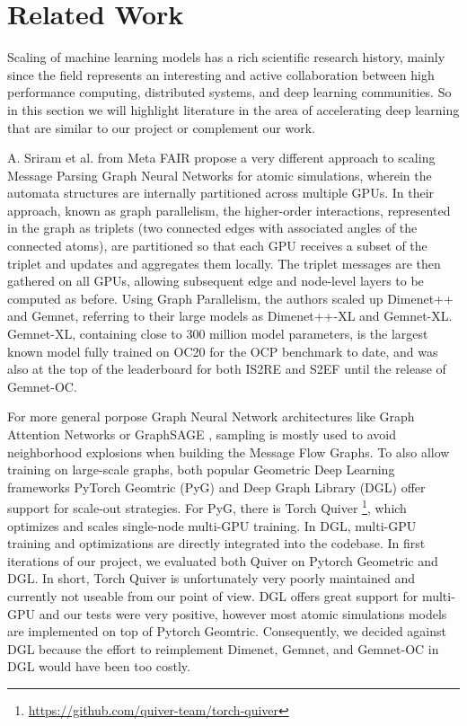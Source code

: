 \section{Related Work}
\label{section:related_work}

Scaling of machine learning models has a rich scientific research history, mainly since the field 
represents an interesting and active collaboration between high performance computing, distributed 
systems, and deep learning communities. So in this section we will highlight literature in the area 
of accelerating deep learning that are similar to our project or complement our work.

A. Sriram et al. \cite*{https://doi.org/10.48550/arxiv.2203.09697} from Meta FAIR propose a very 
different approach to scaling Message Parsing Graph Neural Networks for atomic simulations, wherein 
the automata structures are internally partitioned across multiple GPUs. In their approach, known 
as graph parallelism, the higher-order interactions, represented in the graph as triplets 
(two connected edges with associated angles of the connected atoms), are partitioned so that 
each GPU receives a subset of the triplet and updates and aggregates them locally. The 
triplet messages are then gathered on all GPUs, allowing subsequent edge and node-level layers 
to be computed as before. Using Graph Parallelism, the authors scaled up Dimenet++ and Gemnet, 
referring to their large models as Dimenet++-XL and Gemnet-XL. Gemnet-XL, containing close to 300 
million model parameters, is the largest known model fully trained on OC20 for the OCP benchmark 
to date, and was also at the top of the leaderboard for both IS2RE and S2EF until the release of 
Gemnet-OC. 

For more general porpose Graph Neural Network architectures like Graph Attention Networks 
\cite*{10.48550/ARXIV.1710.10903} or GraphSAGE \cite*{10.48550/ARXIV.1706.02216}, sampling 
is mostly used to avoid neighborhood explosions when building the Message Flow Graphs. To also 
allow training on large-scale graphs, both popular Geometric Deep Learning frameworks PyTorch 
Geomtric (PyG) \cite*{Fey2019} and Deep Graph Library (DGL) \cite*{10.48550/ARXIV.1909.01315} 
offer support for scale-out strategies. For PyG, there is Torch Quiver
\footnote{\url{https://github.com/quiver-team/torch-quiver}}, which optimizes and scales 
single-node multi-GPU training. In DGL, multi-GPU training and optimizations are directly 
integrated into the codebase. In first iterations of our project, we evaluated both Quiver 
on Pytorch Geometric and DGL. In short, Torch Quiver is unfortunately very poorly maintained 
and currently not useable from our point of view. DGL offers great support for multi-GPU and 
our tests were very positive, however most atomic simulations models are implemented on top 
of Pytorch Geomtric. Consequently, we decided against DGL because the effort to reimplement 
Dimenet, Gemnet, and Gemnet-OC in DGL would have been too costly. 



